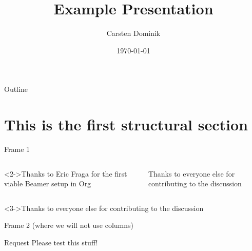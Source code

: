 \documentclass[presentation]{beamer}
\author{Carsten Dominik}
\date{\today}
\title{Example Presentation}
\begin{document}
\maketitle
\begin{frame}{Outline}
\tableofcontents
\end{frame}


\section{This is the first structural section}
\label{sec:org10d1298}

\begin{frame}[label={sec:org1f8d2e9}]{Frame 1}
\begin{columns}
\begin{column}{0.48\columnwidth}
\begin{block}<2->{Thanks to Eric Fraga}
for the first viable Beamer setup in Org
\end{block}
\end{column}
\begin{column}{0.48\columnwidth}
\begin{block}{Thanks to everyone else}
for contributing to the discussion
\end{block}
\end{column}
\end{columns}
\begin{block}<3->{Thanks to everyone else}
for contributing to the discussion

\end{block}
\end{frame}
\begin{frame}[label={sec:orga525120}]{Frame 2 (where we will not use columns)}
\begin{block}{Request}
Please test this stuff!
\end{block}
\end{frame}
\end{document}
